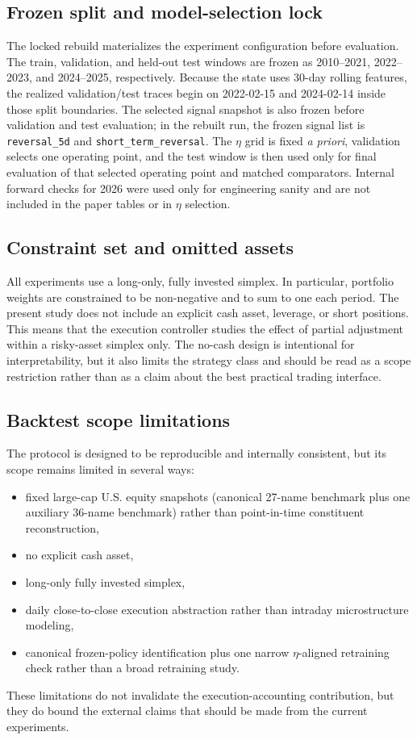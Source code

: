 \documentclass[10pt,twocolumn]{article}
\begin{document}
\subsection{Frozen split and model-selection lock}
The locked rebuild materializes the experiment configuration before evaluation. The train, validation, and held-out test windows are frozen as 2010--2021, 2022--2023, and 2024--2025, respectively. Because the state uses 30-day rolling features, the realized validation/test traces begin on 2022-02-15 and 2024-02-14 inside those split boundaries. The selected signal snapshot is also frozen before validation and test evaluation; in the rebuilt run, the frozen signal list is \texttt{reversal\_5d} and \texttt{short\_term\_reversal}. The $\eta$ grid is fixed \emph{a priori}, validation selects one operating point, and the test window is then used only for final evaluation of that selected operating point and matched comparators. Internal forward checks for 2026 were used only for engineering sanity and are not included in the paper tables or in $\eta$ selection.

\subsection{Constraint set and omitted assets}
All experiments use a long-only, fully invested simplex. In particular, portfolio weights are constrained to be non-negative and to sum to one each period. The present study does not include an explicit cash asset, leverage, or short positions. This means that the execution controller studies the effect of partial adjustment within a risky-asset simplex only. The no-cash design is intentional for interpretability, but it also limits the strategy class and should be read as a scope restriction rather than as a claim about the best practical trading interface.

\subsection{Backtest scope limitations}
The protocol is designed to be reproducible and internally consistent, but its scope remains limited in several ways:
\begin{itemize}[leftmargin=*,itemsep=1pt]
\item fixed large-cap U.S. equity snapshots (canonical 27-name benchmark plus one auxiliary 36-name benchmark) rather than point-in-time constituent reconstruction,
\item no explicit cash asset,
\item long-only fully invested simplex,
\item daily close-to-close execution abstraction rather than intraday microstructure modeling,
\item canonical frozen-policy identification plus one narrow $\eta$-aligned retraining check rather than a broad retraining study.
\end{itemize}
These limitations do not invalidate the execution-accounting contribution, but they do bound the external claims that should be made from the current experiments.
\end{document}
